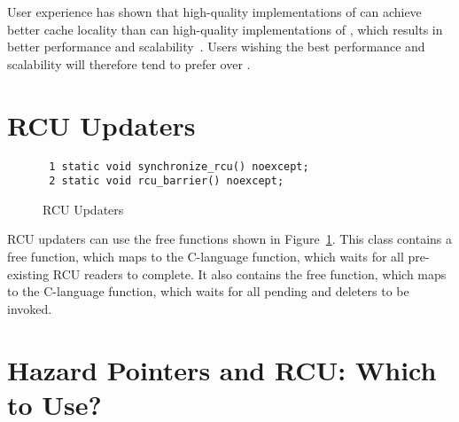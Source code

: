 \documentclass[letterpaper,10pt]{article}
\begin{document}
User experience has shown that high-quality implementations
of  can achieve better cache locality than can 
high-quality implementations of ,
which results in better performance and
scalability~\cite{MathieuDesnoyers2012URCU}.
Users wishing the best performance and scalability will therefore tend
to prefer  over .

\section{RCU Updaters}
\label{sec:RCU Updaters}

\begin{figure}[tbp]
{ \scriptsize
\begin{verbatim}
 1 static void synchronize_rcu() noexcept;
 2 static void rcu_barrier() noexcept;
\end{verbatim}
}
\caption{RCU Updaters}
\label{fig:RCU Updaters}
\end{figure}

RCU updaters can use the free functions shown in
Figure~\ref{fig:RCU Updaters}.
This class contains a  free function,
which maps to the C-language  function, which
waits for all pre-existing RCU readers to complete.
It also contains the  free function,
which maps to the C-language  function,
which waits for all pending  and 
deleters to be invoked.

\section{Hazard Pointers and RCU: Which to Use?}
\label{sec:Hazard Pointers and RCU: Which to Use?}
\end{document}
